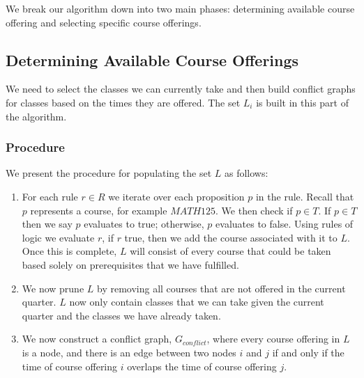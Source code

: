 \documentclass[11pt]{article} %
\begin{document}
We break our algorithm down into two main phases: determining available course
offering and selecting specific course offerings.

\subsection{Determining Available Course Offerings} We need to select the
classes we can currently take and then build conflict graphs for classes based
on the times they are offered. The set $L_i$ is built in this part of the
algorithm.

\subsubsection{Procedure} We present the procedure for populating the set $L$ as
follows: \begin{enumerate} \item For each rule $r \in R$ we iterate over each
proposition $p$ in the rule. Recall that $p$ represents a course, for example
$MATH125$. We then check if $p \in T$.  If $p \in T$ then we say $p$ evaluates
to true; otherwise, $p$ evaluates to false.  Using rules of logic we evaluate
$r$, if $r$ true, then we add the course associated with it to $L$.  Once this
is complete, $L$ will consist of every course that could be taken based solely
on prerequisites that we have fulfilled.  \item We now prune $L$ by removing all
courses that are not offered in the current quarter. $L$ now only contain
classes that we can take given the current quarter and the classes we have
already taken.  \item We now construct a conflict graph, $G_{conflict}$, where
every course offering in $L$ is a node, and there is an edge between two nodes
$i$ and $j$ if and only if the time of course offering $i$ overlaps the time of
course offering $j$.  \end{enumerate}
\end{document}
